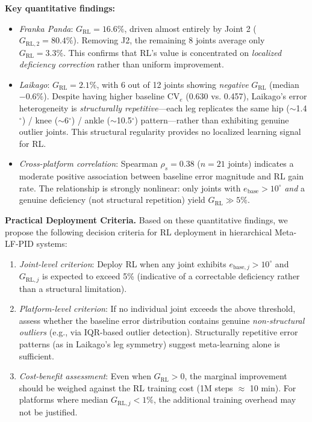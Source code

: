 \documentclass[DTMColor]{ROB-New}
\begin{document}
{\color{blue}\textbf{Key quantitative findings:}
\begin{itemize}
    \item \textit{Franka Panda}: $G_{\mathrm{RL}} = 16.6\%$, driven almost entirely by Joint 2 ($G_{\mathrm{RL},2} = 80.4\%$). Removing J2, the remaining 8 joints average only $G_{\mathrm{RL}} = 3.3\%$. This confirms that RL's value is concentrated on \textit{localized deficiency correction} rather than uniform improvement.
    \item \textit{Laikago}: $G_{\mathrm{RL}} = 2.1\%$, with 6 out of 12 joints showing \textit{negative} $G_{\mathrm{RL}}$ (median $-0.6\%$). Despite having higher baseline $\mathrm{CV}_e$ (0.630 vs. 0.457), Laikago's error heterogeneity is \textit{structurally repetitive}---each leg replicates the same hip ($\sim$1.4$^\circ$) / knee ($\sim$6$^\circ$) / ankle ($\sim$10.5$^\circ$) pattern---rather than exhibiting genuine outlier joints. This structural regularity provides no localized learning signal for RL.
    \item \textit{Cross-platform correlation}: Spearman $\rho_s = 0.38$ ($n = 21$ joints) indicates a moderate positive association between baseline error magnitude and RL gain rate. The relationship is strongly nonlinear: only joints with $e_{\mathrm{base}} > 10^\circ$ \textit{and} a genuine deficiency (not structural repetition) yield $G_{\mathrm{RL}} \gg 5\%$.
\end{itemize}

\textbf{Practical Deployment Criteria.} Based on these quantitative findings, we propose the following decision criteria for RL deployment in hierarchical Meta-LF-PID systems:
\begin{enumerate}
    \item \textit{Joint-level criterion}: Deploy RL when any joint exhibits $e_{\mathrm{base},j} > 10^\circ$ and $G_{\mathrm{RL},j}$ is expected to exceed 5\% (indicative of a correctable deficiency rather than a structural limitation).
    \item \textit{Platform-level criterion}: If no individual joint exceeds the above threshold, assess whether the baseline error distribution contains genuine \textit{non-structural outliers} (e.g., via IQR-based outlier detection). Structurally repetitive error patterns (as in Laikago's leg symmetry) suggest meta-learning alone is sufficient.
    \item \textit{Cost-benefit assessment}: Even when $G_{\mathrm{RL}} > 0$, the marginal improvement should be weighed against the RL training cost (1M steps $\approx$ 10 min). For platforms where median $G_{\mathrm{RL},j} < 1\%$, the additional training overhead may not be justified.
\end{enumerate}
}
\end{document}
